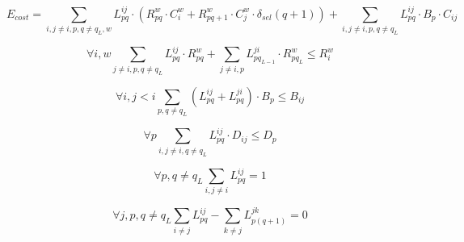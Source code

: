 $$
E_{cost} = 
    \sum_{i,j\neq i,p,q \neq q_L,w} {L^{ij}_{pq} \cdot (R^{w}_{pq} \cdot C^{w}_{i} + R^{w}_{pq+1} \cdot C^{w}_{j} \cdot \delta_{sel}(q+1))} + 
    \sum_{i,j \neq i,p,q \neq q_L} L^{ij}_{pq} \cdot B_p \cdot  C_{ij}
$$

$$
\forall i,w 
    \sum_{j \neq i,p,q \neq q_L} L^{ij}_{pq} \cdot R^{w}_{pq} +
    \sum_{j \neq i,p} L^{ji}_{pq_{L-1}} \cdot R^{w}_{pq_L}
    \leq R^{w}_i
$$

$$
    \forall i, j < i \sum_{p,q \neq q_{L}} (L^{ij}_{pq} + L^{ji}_{pq}) \cdot B_p \leq B_{ij}
$$

$$
    \forall{p} \sum_{i,j \neq i,q \neq q_L} L^{ij}_{pq} \cdot D_{ij} \leq D_p 
$$

$$
    \forall{p,q \neq q_L} \sum_{i,j \neq i}  L^{ij}_{pq} = 1
$$

$$
    \forall{j,p,q \neq q_L} \sum_{i \neq j} L^{ij}_{pq} - \sum_{k \neq j} L^{jk}_{p(q+1)} = 0
$$